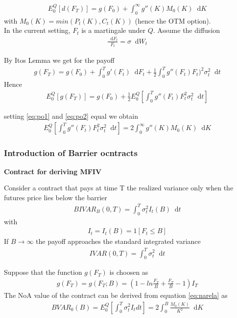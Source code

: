 \documentclass{article}
\newcommand*\diff{\mathop{}\!\mathrm{d}}
\begin{document}
\begin{align}\label{eq:po1}
    E_{0}^{Q}[d(F_{T})] = g(F_{0}) + \int_{0}^{\infty} g''(K)M_{0}(K) \diff K
\end{align}
with $M_{0}(K) = min(P_{t}(K), C_{t}(K))$ (hence the OTM option).\\

In the current setting, $F_{t}$ is a martingale under $Q$. Assume the diffusion
\begin{align}
    \frac{\diff F_ {t}}{F_{t}} = \sigma \diff W_{t}
\end{align}

By Itos Lemma we get for the payoff
\begin{align*}
    g(F_{T}) = g(F_{0}) + \int_{0}^{T} g'(F_{t}) \diff F_{t} + \frac{1}{2}\int_{0}^{T} g''(F_{t})F_{t})^{2} \sigma_{t}^{2} \diff t
\end{align*}
Hence
\begin{align}\label{eq:po2}
    E_{0}^{Q}[g(F_{T})] = g(F_{0}) + \frac{1}{2} E_{0}^{Q} \left[ \int_{0}^{T} g''(F_{t}) F_{t}^{2} \sigma_{t}^{2} \diff t \right]
\end{align}

setting \ref{eq:po1} and \ref{eq:po2} equal we obtain
\begin{align}\label{eq:narela}
    E_{0}^{Q} \left[ \int_{0}^{T} g''(F_{t}) F_{t}^{2} \sigma_{t}^{2} \diff t \right] = 2 \int_{0}^{\infty} g''(K)M_{0}(K) \diff K
\end{align}

\subsubsection{Introduction of Barrier ocntracts}

\textbf{Contract for deriving MFIV}

Consider a contract that pays at time T the realized variance only when the futures price lies below the barrier
\begin{align*}
BIVAR_{B}(0,T) = \int_{0}^{T} \sigma_{t}^{2} I_{t}(B) \diff t
\end{align*}
with 
\begin{align*}
I_{t} = I_{t}(B) = 1[F_{t} \leq B]
\end{align*}
If $B \rightarrow \infty$ the payoff approaches the standard integrated variance
\begin{align*}
IV AR(0,T) = \int_{0}^{T} \sigma_{t}^{2} \diff t
\end{align*}

Suppose that the function $g(F_{T})$ is choosen as
\begin{align*}
g(F_{T}) = g(F_{T};B) = \left (1 - ln\frac{F_{T}}{B} + \frac{F_{T}}{B} - 1 \right) I_{T}
\end{align*}
The NoA value of the contract can be derived from equation \ref{eq:narela} as
\begin{align*}
BV AR_{0}(B) = E_{0}^{Q} \left [\int_{0}^{T} \sigma_{t}^{2} I_{t} dt \right] = 2 \int_{0}^{B} \frac{M_{0}(K)}{K^{2}} \diff K
\end{align*}
\end{document}

